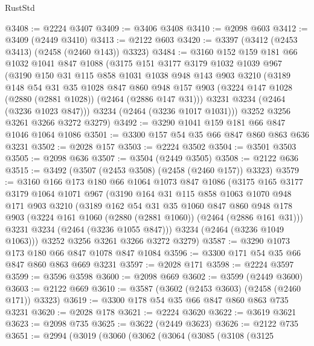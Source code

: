 \begin{lexlean}{RustStd}
\begin{coremodule}
@3408 := @2224 @3407
@3409 := @3406 @3408
@3410 := @2098 @603
@3412 := @3409 (@2449 @3410)
@3413 := @2122 @603
@3420 := @3397 (@3412 (@2453 @3413) (@2458 (@2460 @143)) @3323)
@3484 := @3160
    @152
    @159
    @181
    @66
    @1032
    @1041
    @847
    @1088
    (@3175
      @151
      @3177
      @3179
      @1032
      @1039
      @967
      (@3190
        @150
        @31
        @115
        @858
        @1031
        @1038
        @948
        @143
        @903
        @3210
        (@3189
          @148
          @54
          @31
          @35
          @1028
          @847
          @860
          @948
          @157
          @903
          (@3224 @147 @1028 (@2880 (@2881 @1028)) (@2464 (@2886 @147 @31)))
          @3231
          @3234
          (@2464 (@3236 @1023 @847)))
        @3234
        (@2464 (@3236 @1017 @1031)))
      @3252
      @3256
      @3261
      @3266
      @3272
      @3279)
@3492 := @3290 @1041 @159 @181 @66 @847 @1046 @1064 @1086
@3501 := @3300 @157 @54 @35 @66 @847 @860 @863 @636 @3231
@3502 := @2028 @157
@3503 := @2224 @3502
@3504 := @3501 @3503
@3505 := @2098 @636
@3507 := @3504 (@2449 @3505)
@3508 := @2122 @636
@3515 := @3492 (@3507 (@2453 @3508) (@2458 (@2460 @157)) @3323)
@3579 := @3160
    @166
    @173
    @180
    @66
    @1064
    @1073
    @847
    @1086
    (@3175
      @165
      @3177
      @3179
      @1064
      @1071
      @967
      (@3190
        @164
        @31
        @115
        @858
        @1063
        @1070
        @948
        @171
        @903
        @3210
        (@3189
          @162
          @54
          @31
          @35
          @1060
          @847
          @860
          @948
          @178
          @903
          (@3224 @161 @1060 (@2880 (@2881 @1060)) (@2464 (@2886 @161 @31)))
          @3231
          @3234
          (@2464 (@3236 @1055 @847)))
        @3234
        (@2464 (@3236 @1049 @1063)))
      @3252
      @3256
      @3261
      @3266
      @3272
      @3279)
@3587 := @3290 @1073 @173 @180 @66 @847 @1078 @847 @1084
@3596 := @3300 @171 @54 @35 @66 @847 @860 @863 @669 @3231
@3597 := @2028 @171
@3598 := @2224 @3597
@3599 := @3596 @3598
@3600 := @2098 @669
@3602 := @3599 (@2449 @3600)
@3603 := @2122 @669
@3610 := @3587 (@3602 (@2453 @3603) (@2458 (@2460 @171)) @3323)
@3619 := @3300 @178 @54 @35 @66 @847 @860 @863 @735 @3231
@3620 := @2028 @178
@3621 := @2224 @3620
@3622 := @3619 @3621
@3623 := @2098 @735
@3625 := @3622 (@2449 @3623)
@3626 := @2122 @735
@3651 := @2994
    (@3019
      (@3060
        (@3062
          (@3064
            (@3085
              (@3108
                (@3125

\end{coremodule}
\end{lexlean}
